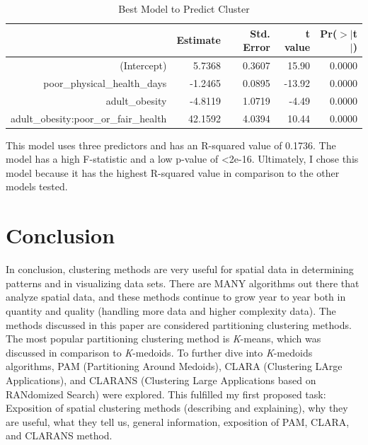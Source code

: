 \documentclass[12pt,twoside]{amherstthesis}
\begin{document}
  \begin{table}[ht]
  \centering
  \begin{tabular}{rrrrr}
    \hline
   & Estimate & Std. Error & t value & Pr($>$$|$t$|$) \\ 
    \hline
  (Intercept) & 5.7368 & 0.3607 & 15.90 & 0.0000 \\ 
    poor\_physical\_health\_days & -1.2465 & 0.0895 & -13.92 & 0.0000 \\ 
    adult\_obesity & -4.8119 & 1.0719 & -4.49 & 0.0000 \\ 
    adult\_obesity:poor\_or\_fair\_health & 42.1592 & 4.0394 & 10.44 & 0.0000 \\ 
     \hline
  \end{tabular}
  \caption{Best Model to Predict Cluster} 
  \end{table}
  
  This model uses three predictors and has an R-squared value of 0.1736.
  The model has a high F-statistic and a low p-value of \textless{}2e-16.
  Ultimately, I chose this model because it has the highest R-squared
  value in comparison to the other models tested.
  
  \chapter*{Conclusion}\label{conclusion}
  
  \setcounter{chapter}{4} \setcounter{section}{0}
  
  In conclusion, clustering methods are very useful for spatial data in
  determining patterns and in visualizing data sets. There are MANY
  algorithms out there that analyze spatial data, and these methods
  continue to grow year to year both in quantity and quality (handling
  more data and higher complexity data). The methods discussed in this
  paper are considered partitioning clustering methods. The most popular
  partitioning clustering method is \emph{K}-means, which was discussed in
  comparison to \emph{K}-medoids. To further dive into \emph{K}-medoids
  algorithms, PAM (Partitioning Around Medoids), CLARA (Clustering LArge
  Applications), and CLARANS (Clustering Large Applications based on
  RANdomized Search) were explored. This fulfilled my first proposed task:
  Exposition of spatial clustering methods (describing and explaining),
  why they are useful, what they tell us, general information, exposition
  of PAM, CLARA, and CLARANS method.
  
\end{document}
